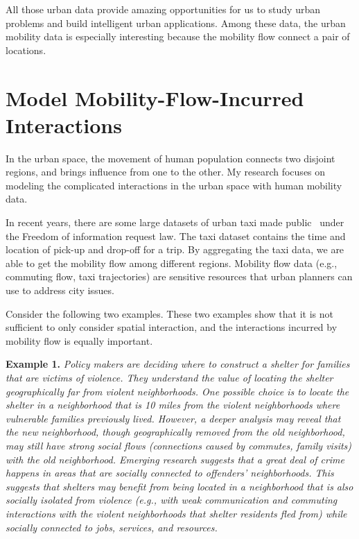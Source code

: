 All those urban data provide amazing opportunities for us to study urban problems and build intelligent urban applications. Among these data, the urban mobility data is especially interesting because the mobility flow connect a pair of locations. 


\section{Model Mobility-Flow-Incurred Interactions}


In the urban space, the movement of human population connects two disjoint regions, and brings influence from one to the other. My research focuses on modeling the complicated interactions in the urban space with human mobility data.  


In recent years, there are some large datasets of urban taxi made public~\cite{nyctaxi} under the Freedom of information request law.  The taxi dataset contains the time and location of pick-up and drop-off for a trip. By aggregating the taxi data, we are able to get the mobility flow among different regions.
Mobility flow data (e.g., commuting flow, taxi trajectories) are sensitive resources that urban planners can use to address city issues.




Consider the following two examples. These two examples show that it is not sufficient to only consider spatial interaction, and the interactions incurred by mobility flow is equally important.


\textbf{Example 1.} \emph{Policy makers are deciding where to construct a shelter for families that are victims of violence. They understand the value of locating the shelter geographically far from violent neighborhoods. One possible choice is to locate the shelter in a neighborhood that is 10 miles from the violent neighborhoods where vulnerable families previously lived. However, a deeper analysis may reveal that the new neighborhood, though geographically removed from the old neighborhood, may still have strong social flows (connections caused by commutes, family visits) with the old neighborhood. Emerging research suggests that a great deal of crime happens in areas that are socially connected to offenders' neighborhoods. This suggests that shelters may benefit from being located in a neighborhood that is also socially isolated from violence (e.g., with weak communication and commuting interactions with the violent neighborhoods that shelter residents fled from) while socially connected to jobs, services, and resources.}


